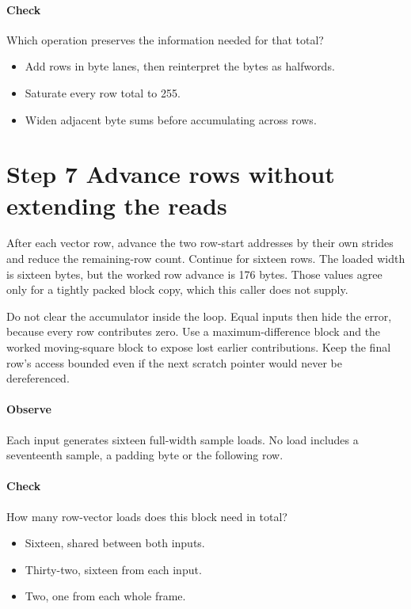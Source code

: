 \paragraph{Check} Which operation preserves the information needed for that total?
\begin{itemize}
  \item[A.] Add rows in byte lanes, then reinterpret the bytes as halfwords.
  \item[B.] Saturate every row total to 255.
  \item[C.] Widen adjacent byte sums before accumulating across rows.
\end{itemize}

\section{Step 7 Advance rows without extending the reads}\label{h263-sad-s07}
After each vector row, advance the two row-start addresses by their own strides
and reduce the remaining-row count. Continue for sixteen rows. The loaded width
is sixteen bytes, but the worked row advance is 176 bytes. Those values agree
only for a tightly packed block copy, which this caller does not supply.

Do not clear the accumulator inside the loop. Equal inputs then hide the error,
because every row contributes zero. Use a maximum-difference block and the worked
moving-square block to expose lost earlier contributions. Keep the final row's
access bounded even if the next scratch pointer would never be dereferenced.

\paragraph{Observe} Each input generates sixteen full-width sample loads. No
load includes a seventeenth sample, a padding byte or the following row.
\paragraph{Check} How many row-vector loads does this block need in total?
\begin{itemize}
  \item[A.] Sixteen, shared between both inputs.
  \item[B.] Thirty-two, sixteen from each input.
  \item[C.] Two, one from each whole frame.
\end{itemize}

